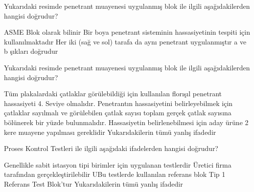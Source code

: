 \begin{question}[subtitle=]
  	\begin{figure}[!htb]
		\centering
	\end{figure}

Yukarıdaki resimde penetrant muayenesi uygulanmış blok ile ilgili aşağıdakilerden hangisi doğrudur?
	\begin{tasks}
          \task ASME Blok olarak bilinir
          \task Bir boya penetrant sisteminin hassasiyetinin tespiti için kullanılmaktadır
          \task Her iki (sağ ve sol) tarafa da aynı penetrant uygulanmıştır
          \task a ve b şıkları doğrudur \correct
	\end{tasks}
\end{question}
\begin{solution}
	\correct
\end{solution}

\begin{question}[subtitle=]
  	\begin{figure}[!htb]
		\centering
		\fbox{\texttt{[image: refproduct]}}
	\end{figure}

Yukarıdaki resimde penetrant muayenesi uygulanmış blok ile ilgili aşağıdakilerden hangisi doğrudur?
	\begin{tasks}
          \task Tüm plakalardaki çatlaklar görülebildiği için kullanılan florışıl penetrant hassasiyeti 4. Seviye olmalıdır.
          \task Penetrantın hassasiyetini belirleyebilmek için çatlaklar sayılmalı ve görülebilen çatlak sayısı toplam gerçek çatlak sayısına bölünerek bir yüzde bulunmalıdır.
          \task Hassasiyetin belirlenebilmesi için aday ürüne 2 kere muayene yapılması gereklidir
          \task Yukarıdakilerin tümü yanlış ifadedir \correct
	\end{tasks}
\end{question}
\begin{solution}
	\correct
\end{solution}

\begin{question}[subtitle=]
Proses Kontrol Testleri ile ilgili aşağıdaki ifadelerden hangisi doğrudur?
	\begin{tasks}
          \task Genellikle sabit istasyon tipi birimler için uygulanan testlerdir \correct
          \task Üretici firma tarafından gerçekleştirilebilir
          \task UBu testlerde kullanılan referans blok Tip 1 Referans Test Blok’tur
          \task Yukarıdakilerin tümü yanlış ifadedir
	\end{tasks}
\end{question}
\begin{solution}
	\correct
\end{solution}
